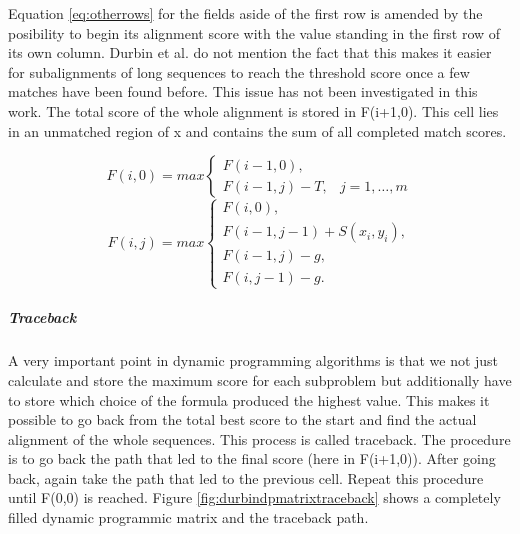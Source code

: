 Equation \ref{eq:otherrows} for the fields aside of the first row is amended by the posibility to begin its alignment score with the value standing in the first row of its own column.
Durbin et al. do not mention the fact that this makes it easier for subalignments of long sequences to reach the threshold score once a few matches have been found before.
This issue has not been investigated in this work.
The total score of the whole alignment is stored in F(i+1,0). This cell lies in an unmatched region of x and contains the sum of all completed match scores.


\begin{equation}
F(i,0) = max \left\{ \begin{array}{lr}F(i-1,0),&\\F(i-1,j)-T,& j=1,\dots,m\end{array}\right.
\label{eq:firstrow}
\end{equation}
\begin{equation}
F(i,j) = max \left\{ \begin{array}{lr}F(i,0),\\F(i-1,j-1)+S(x_i,y_i),\\F(i-1,j)-g,\\F(i,j-1)-g.\end{array}\right.
\label{eq:otherrows}
\end{equation}

\subparagraph{Traceback}
A very important point in dynamic programming algorithms is that we not just calculate and store the maximum score for each subproblem but additionally have to store which choice of the formula produced the highest value.
This makes it possible to go back from the total best score to the start and find the actual alignment of the whole sequences.
This process is called traceback.
The procedure is to go back the path that led to the final score (here in F(i+1,0)).
After going back, again take the path that led to the previous cell. Repeat this procedure until F(0,0) is reached.
Figure \ref{fig:durbindpmatrixtraceback} shows a completely filled dynamic programmic matrix and the traceback path.

